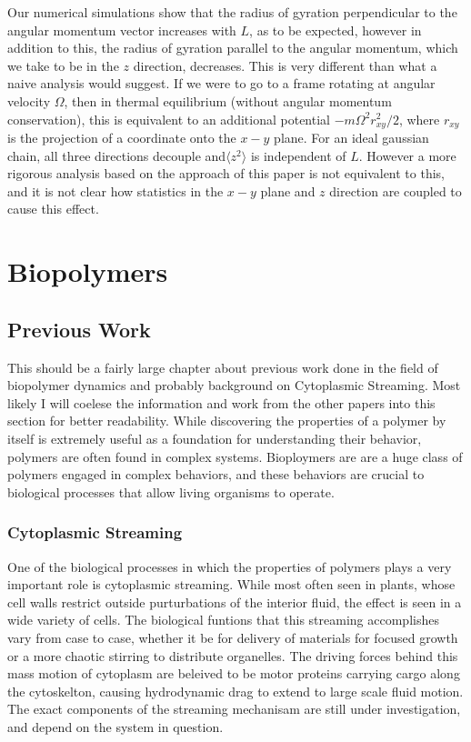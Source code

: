\documentclass[11pt]{ucthesis}
\begin{document}
Our numerical simulations show that the radius of gyration perpendicular
to the angular momentum vector increases with $L$, as to be expected,
however in addition to this, the radius of gyration parallel to the
angular momentum, which we take to be in the $z$ direction, decreases.
This is very different than what a naive analysis would suggest. If we
were to go to a frame rotating at angular velocity $\Omega$, then in
thermal equilibrium (without angular momentum conservation), this is
equivalent to an additional potential $- m \Omega^2 r^2_{xy}/2$, where
$r_{xy}$ is the projection of a coordinate onto the $x-y$ plane.  For an ideal
gaussian chain, all three directions decouple and$\langle z^2\rangle$
is independent of $L$. However a more rigorous analysis based on the
approach of this paper is not equivalent to this, and it is not clear
how statistics in the $x-y$ plane and $z$ direction are coupled to cause
this effect.


\part{Biopolymers}

\chapter{Previous Work}
This should be a fairly large chapter about previous work done in the field of biopolymer dynamics and probably background on Cytoplasmic Streaming.
Most likely I will coelese the information and work from the other papers into this section for better readability.
While discovering the properties of a polymer by itself is extremely useful as a foundation for understanding their behavior, polymers are often found in complex systems. Bioploymers are are a huge class of polymers engaged in complex behaviors, and these behaviors are crucial to biological processes that allow living organisms to operate.

\section{Cytoplasmic Streaming}
One of the biological processes in which the properties of polymers plays a very important role is cytoplasmic streaming.
While most often seen in plants, whose cell walls restrict outside purturbations of the interior fluid, the effect is seen in a wide variety of cells. 
The biological funtions that this streaming accomplishes vary from case to case, whether it be for delivery of materials for focused growth or a more chaotic stirring to distribute organelles.
The driving forces behind this mass motion of cytoplasm are beleived to be motor proteins carrying cargo along the cytoskelton, causing hydrodynamic drag to extend to large scale fluid motion.
The exact components of the streaming mechanisam are still under investigation, and depend on the system in question.
\end{document}

